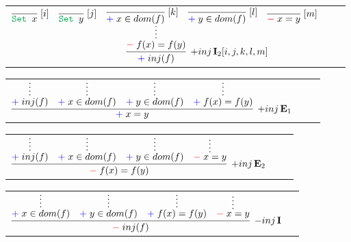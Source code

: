 \documentclass[11pt]{article}
\begin{document}
\noindent
\begin{tabular}{ccc}
$
\infer[\AssertRule{inj\,}\Intro{2}{[i,j,k,l,m]}]{\Assert{inj(f)}}{
	\infer*{\Deny{f(x)= f(y)}}{
		\infer[\Label{i}]{\Set{x}}{} 
		& 
		\infer[\Label{j}]{\Set{y}}{}
		& 
		\infer[\Label{k}]{\Assert{x\in dom(f)}}{}
		& 
		\infer[\Label{l}]{\Assert{y\in dom(f)}}{}
		& 
		\infer[\Label{m}]{\Deny{x= y}}{}
	}
}
$
\end{tabular}


\bigskip

\noindent
\begin{tabular}{ccc}
$
\infer[\AssertRule{inj\,}\Elim{1}]{\Assert{x= y}}{
	\infer*{\Assert{inj(f)}}{} 
	& 
	\infer*{\Assert{x\in dom(f)}}{}
	& 
	\infer*{\Assert{y\in dom(f)}}{}
	& 
	\infer*{\Assert{f(x)= f(y)}}{}
}
$
\end{tabular}
\bigskip

\noindent
\begin{tabular}{ccc}
$
\infer[\AssertRule{inj\,}\Elim{2}]{\Deny{f(x)= f(y)}}{
	\infer*{\Assert{inj(f)}}{} 
	& 
	\infer*{\Assert{x\in dom(f)}}{}
	& 
	\infer*{\Assert{y\in dom(f)}}{}
	& 
	\infer*{\Deny{x= y}}{}
}
$
\end{tabular}
\bigskip

\noindent
\begin{tabular}{cc}
$
\infer[\DenyRule{inj\,}\Intro{}]{\Deny{inj(f)}}{
	\infer*{\Assert{x\in dom(f)}}{}
	&
	\infer*{\Assert{y\in dom(f)}}{}
	&
	\infer*{\Assert{f(x)= f(y)}}{}
	&
	\infer*{\Deny{x= y}}{}
}
$
\end{tabular}
\bigskip
\end{document}
